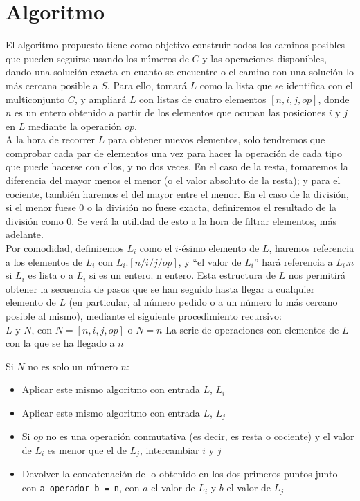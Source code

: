 \section{Algoritmo}
El algoritmo propuesto tiene como objetivo construir todos los caminos posibles
que pueden seguirse usando los números de $C$ y las operaciones disponibles,
dando una solución exacta en cuanto se encuentre o el camino con una solución lo
 más cercana posible a $S$. Para ello, tomará $L$ como la lista que se
identifica con el multiconjunto $C$, y ampliará $L$ con listas de cuatro elementos
$[n, i, j, op]$, donde $n$ es un entero obtenido a partir de los elementos que ocupan
las posiciones $i$ y $j$ en $L$ mediante la operación $op$.\\

A la hora de recorrer $L$ para obtener nuevos elementos, solo tendremos que
comprobar cada par de elementos una vez para hacer la operación de cada tipo que
puede hacerse con ellos, y no dos veces. En el caso de la resta, tomaremos la
diferencia del mayor menos el menor (o el valor absoluto de la resta); y para
el cociente, también haremos el del mayor entre el menor. En el caso de la
división, si el menor fuese $0$ o la división no fuese exacta, definiremos el
resultado de la división como $0$. Se verá la utilidad de esto a la hora de
filtrar elementos, más adelante. \\

Por comodidad,
definiremos $L_i$ como el $i$-ésimo elemento de $L$, haremos referencia a los
elementos de $L_i$ con $L_i.[n/i/j/op]$, y ``el valor de $L_i$'' hará referencia
a $L_i.n$ si $L_i$ es lista o a $L_i$ si es un entero.
n entero. Esta estructura de $L$ nos permitirá obtener la secuencia de pasos que
se han seguido hasta llegar a cualquier elemento de $L$ (en particular, al número
pedido o a un número lo más cercano posible al mismo),
mediante el siguiente procedimiento recursivo: \\

{$L$ y $N$, con $N = [n, i, j, op]$ o $N = n$}
{La serie de operaciones con elementos de $L$ con la que se ha llegado a $n$}{
	Si $N$ no es solo un número $n$:
	\begin{itemize}
	\setlength{\itemsep}{1pt}
	\setlength{\parskip}{0pt}
	\setlength{\parsep}{0pt}
	\item Aplicar este mismo algoritmo con entrada $L$, $L_i$
	\item Aplicar este mismo algoritmo con entrada $L$, $L_j$
	\item Si $op$ no es una operación conmutativa (es decir, es resta o cociente)
	y el valor de $L_i$ es menor que el de $L_j$, intercambiar $i$ y $j$
	\item Devolver la concatenación de lo obtenido en los dos primeros puntos
	junto con \texttt{a operador b = n}, con $a$ el valor de $L_i$ y $b$
	el valor de $L_j$
	\end{itemize}
}\\

